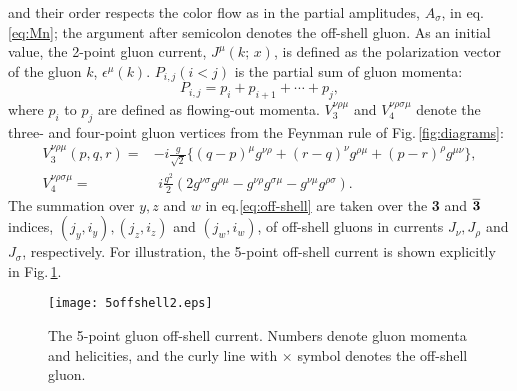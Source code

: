 \documentclass[a4paper,11pt]{article}
\begin{document}
 and their order respects the color flow as in the partial amplitudes,
 $A_{\sigma}$, in eq.\eqref{eq:Mn}; the argument after semicolon denotes the off-shell gluon. As an initial value, the 2-point gluon current,
 $J^{\mu}(k;\,x)$, is defined as the polarization vector of the gluon $k$,
 $\epsilon^{\mu}(k)$. $P_{i,j} (i<j)$ is the partial sum
 of gluon momenta:
 \begin{equation}
P_{i,j}=p_i+p_{i+1}+\cdots+p_j,
 \end{equation}
where $p_i$ to $p_j$ are defined as
 flowing-out momenta.
$V_3^{\nu\rho\mu}$ and $V_4^{\nu\rho\sigma\mu}$ denote the three- and
 four-point gluon vertices from the Feynman rule of Fig.\,\ref{fig:diagrams}:
\begin{align}
V_3^{\nu\rho\mu}(p,q,r)=&-i\frac{g}{\sqrt{2}}\bigl\{(q-p)^{\mu}g^{\nu\rho}+(r-q)^{\nu}g^{\rho\mu}+(p-r)^{\rho}g^{\mu\nu}\bigr\},\\
V_4^{\nu\rho\sigma\mu}=&\,\,i\frac{g^2}{2}(2g^{\nu\sigma}g^{\rho\mu}-g^{\nu\rho}g^{\sigma\mu}-g^{\nu\mu}g^{\rho\sigma}).
\end{align}
The summation over $y,z$ and $w$ in eq.\eqref{eq:off-shell} are taken over the {\bf 3} and $\overline{{\bf 3}}$ indices, $(j_y, i_y), (j_z, i_z)$
 and $(j_w, i_w)$, of off-shell gluons in currents $J_{\nu}, J_{\rho}$ and $J_{\sigma}$, respectively.
 For
illustration, the 5-point off-shell current is shown explicitly in
Fig.\,\ref{fig:5offshell}.
\begin{figure}
\begin{center}
\texttt{[image: 5offshell2.eps]}
\caption{The 5-point gluon off-shell current. Numbers denote gluon momenta
 and helicities, and the curly line with $\times$ symbol denotes the off-shell
 gluon.}
\label{fig:5offshell}
\end{center}
\end{figure}
\end{document}
